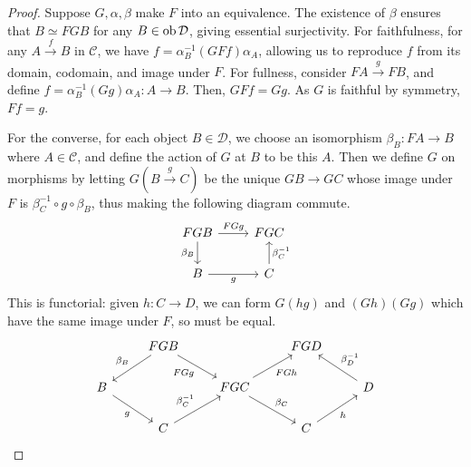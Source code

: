 \begin{proof}
    Suppose \( G, \alpha, \beta \) make \( F \) into an equivalence.
    The existence of \( \beta \) ensures that \( B \simeq FGB \) for any \( B \in \operatorname{ob} \mathcal D \), giving essential surjectivity.
    For faithfulness, for any \( A \xrightarrow f B \) in \( \mathcal C \), we have \( f = \alpha_B^{-1} (GFf) \alpha_A \), allowing us to reproduce \( f \) from its domain, codomain, and image under \( F \).
    For fullness, consider \( FA \xrightarrow g FB \), and define \( f = \alpha_B^{-1} (Gg) \alpha_A : A \to B \).
    Then, \( GFf = Gg \).
    As \( G \) is faithful by symmetry, \( Ff = g \).

    For the converse, for each object \( B \in \mathcal D \), we choose an isomorphism \( \beta_B : FA \to B \) where \( A \in \mathcal C \), and define the action of \( G \) at \( B \) to be this \( A \).
    Then we define \( G \) on morphisms by letting \( G(B \xrightarrow g C) \) be the unique \( GB \to GC \) whose image under \( F \) is \( \beta_C^{-1} \circ g \circ \beta_B \), thus making the following diagram commute.
\[\begin{tikzcd}
	FGB & FGC \\
	B & C
	\arrow["{\beta_B}"', from=1-1, to=2-1]
	\arrow["g"', from=2-1, to=2-2]
	\arrow["{\beta_C^{-1}}"', from=2-2, to=1-2]
	\arrow["FGg", from=1-1, to=1-2]
\end{tikzcd}\]
    This is functorial: given \( h : C \to D \), we can form \( G(hg) \) and \( (Gh)(Gg) \) which have the same image under \( F \), so must be equal.
\[\begin{tikzcd}
	& FGB && FGD \\
	B && FGC && D \\
	& C && C
	\arrow["{\beta_B}"', from=1-2, to=2-1]
	\arrow["g"', from=2-1, to=3-2]
	\arrow["{\beta_C^{-1}}", from=3-2, to=2-3]
	\arrow["FGg"', from=1-2, to=2-3]
	\arrow["{\beta_C}", from=2-3, to=3-4]
	\arrow["h"', from=3-4, to=2-5]
	\arrow["{\beta_D^{-1}}"', from=2-5, to=1-4]
	\arrow["FGh"', from=2-3, to=1-4]

\end{tikzcd}\]
\end{proof}
